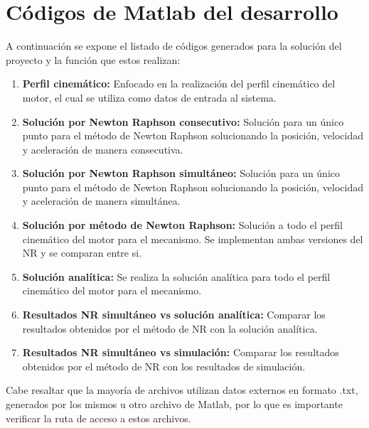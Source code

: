 \documentclass[12pt]{article}
\begin{document}
\section{Códigos de Matlab del desarrollo}
A continuación se expone el listado de códigos generados para la solución del proyecto y la función que estos realizan:
\begin{enumerate}
    \item \textbf{Perfil cinemático:} Enfocado en la realización del perfil cinemático del motor, el cual se utiliza como datos de entrada al sistema.
    
    \item \textbf{Solución por Newton Raphson consecutivo:} Solución para un único punto para el método de Newton Raphson solucionando la posición, velocidad y aceleración de manera consecutiva. 
    \item \textbf{Solución por Newton Raphson simultáneo:} Solución para un único punto para el método de Newton Raphson solucionando la posición, velocidad y aceleración de manera simultánea.
    
    \item \textbf{Solución por método de Newton Raphson:} Solución a todo el perfil cinemático del motor para el mecanismo. Se implementan ambas versiones del NR y se comparan entre si.
    
    \item\textbf{ Solución analítica:} Se realiza la solución analítica para todo el perfil cinemático del motor para el mecanismo.
    
    \item \textbf{Resultados NR simultáneo vs solución analítica:} Comparar los resultados obtenidos por el método de NR con la solución analítica.
    
    \item \textbf{Resultados NR simultáneo vs simulación:} Comparar los resultados obtenidos por el método de NR con los resultados de simulación.
\end{enumerate}
Cabe resaltar que la mayoría de archivos utilizan datos externos en formato .txt, generados por los mismos u otro archivo de Matlab, por lo que es importante verificar la ruta de acceso a estos archivos.

\newpage
\end{document}
